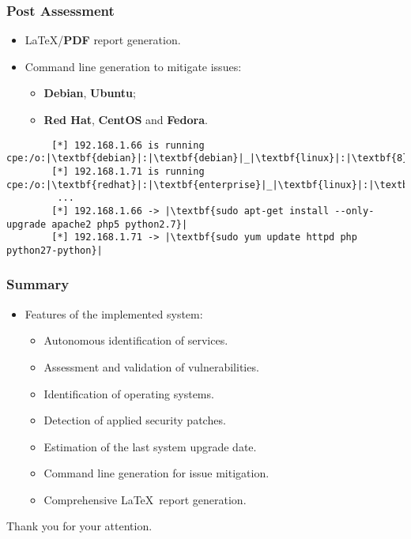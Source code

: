 \documentclass[aspectratio=169,xcolor={usenames,dvipsnames}]{beamer}
\newcommand{\ispace}{\vspace{10pt}}
\begin{document}
\begin{frame}[fragile]
	\frametitle{Post Assessment}
	
	\begin{itemize}
		\item \LaTeX/\textbf{PDF} report generation.
	\end{itemize}
	
	\ispace
	
	\begin{itemize}
		\item Command line generation to mitigate issues:
		\begin{itemize}
			\item \textbf{Debian}, \textbf{Ubuntu};
			\item \textbf{Red Hat}, \textbf{CentOS} and \textbf{Fedora}.
		\end{itemize}
	\end{itemize}
	
	\ispace
	
	\begin{center}
	\begin{minipage}{.91\textwidth}
	\begin{verbatim}
		[*] 192.168.1.66 is running cpe:/o:|\textbf{debian}|:|\textbf{debian}|_|\textbf{linux}|:|\textbf{8}|
		[*] 192.168.1.71 is running cpe:/o:|\textbf{redhat}|:|\textbf{enterprise}|_|\textbf{linux}|:|\textbf{7}|
		 ... 
		[*] 192.168.1.66 -> |\textbf{sudo apt-get install --only-upgrade apache2 php5 python2.7}|
		[*] 192.168.1.71 -> |\textbf{sudo yum update httpd php python27-python}|
	\end{verbatim}
	\end{minipage}
	\end{center}
\end{frame}

\begin{frame}
	\frametitle{Summary}
	
	\begin{itemize}
		\item Features of the implemented system:
		\begin{itemize}
			\item Autonomous identification of services.
			\item Assessment and validation of vulnerabilities.
			\item Identification of operating systems.
			\item Detection of applied security patches.
			\item Estimation of the last system upgrade date.
			\item Command line generation for issue mitigation.
			\item Comprehensive \LaTeX\ report generation.
		\end{itemize}
	\end{itemize}
	
	\vspace{15pt}
	
	{\Large Thank you for your attention.}
\end{frame}
\end{document}
